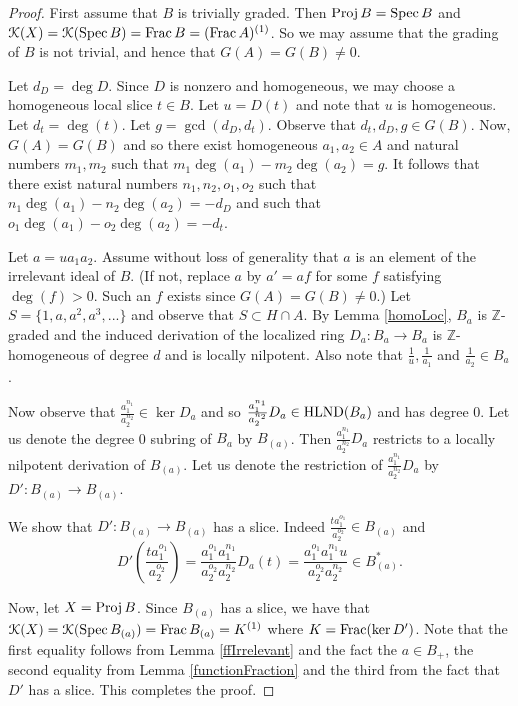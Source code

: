 \documentclass[12pt]{amsart}
\theoremstyle{plain}
\theoremstyle{definition}
\newcommand{\Spec}{		\operatorname{{\rm Spec}}}
\newcommand{\Proj}{		\operatorname{{\rm Proj}}}
\newcommand{\Frac}{		\operatorname{{\rm Frac}}}
\newcommand{\Integ}{\ensuremath{\mathbb{Z}}}
\newcommand{\Keul}{\EuScript{K}}
\newcommand{\hlnd}{\operatorname{{\rm HLND}}}
\begin{document}
\begin{proof}
	First assume that $B$ is trivially graded. Then $\Proj B = \Spec B$ and $\Keul(X) = \Keul(\Spec B) = \Frac B = (\Frac A)^{(1)}$. So we may assume that the grading of $B$ is not trivial, and hence that $G(A) = G(B) \neq 0$.  
	
	Let $d_D = \deg D$. Since $D$ is nonzero and homogeneous, we may choose a homogeneous local slice $t \in B$. Let $u = D(t)$ and note that $u$ is homogeneous. Let $d_t = \deg(t)$. Let $g = \gcd(d_D,d_t)$. Observe that $d_t,d_D,g \in G(B)$. Now, $G(A) = G(B)$ and so there exist homogeneous $a_1,a_2 \in A$ and natural numbers $m_1,m_2$ such that $m_1\deg(a_1) - m_2\deg(a_2) = g$. It follows that there exist natural numbers $n_1,n_2,o_1,o_2$ such that $n_1\deg(a_1) - n_2 \deg(a_2) = -d_D$ and such that $o_1\deg(a_1) - o_2 \deg(a_2) = -d_t$. 
	
	Let $a = ua_1a_2$. Assume without loss of generality that $a$ is an element of the irrelevant ideal of $B$. (If not, replace $a$ by $a' = af$ for some $f$ satisfying $\deg(f) > 0$. Such an $f$ exists since $G(A) = G(B) \neq 0$.) Let $S = \{1, a, a^2, a^3, ... \}$ and observe that $S \subset H \cap A$. By Lemma \ref{homoLoc}, $B_a$ is $\Integ$-graded and the induced derivation of the localized ring $D_a: B_a \to B_a$ is $\Integ$-homogeneous of degree $d$ and is locally nilpotent. Also note that $\frac{1}{u},\frac{1}{a_1}$ and $\frac{1}{a_2} \in B_a$.  
	
	Now observe that $\frac{a_1^{n_1}}{a_2^{n_2}} \in \ker D_a$ and so $\frac{a_1^{n_1}}{a_2^{n_2}} D_a \in \hlnd(B_a)$ and has degree 0. Let us denote the degree 0 subring of $B_a$ by $B_{(a)}$. Then $\frac{a_1^{n_1}}{a_2^{n_2}} D_a$ restricts to a locally nilpotent derivation of $B_{(a)}$. Let us denote the restriction of $\frac{a_1^{n_1}}{a_2^{n_2}} D_a$ by $D' : B_{(a)} \to  B_{(a)}$.  
	
	We show that $D': B_{(a)} \to B_{(a)}$ has a slice. Indeed $\frac{ta_1^{o_1}}{a_2^{o_2}} \in B_{(a)}$ and $$D'(\frac{ta_1^{o_1}}{a_2^{o_2}}) = \frac{a_1^{o_1}a_1^{n_1}}{a_2^{o_2}a_2^{n_2}}D_a(t) = \frac{a_1^{o_1}a_1^{n_1}u}{a_2^{o_2}a_2^{n_2}} \in B_{(a)}^*.$$ 
	
	Now, let $X = \Proj B$. Since $B_{(a)}$ has a slice, we have that $\Keul(X) = \Keul(\Spec B_{(a)}) = \Frac B_{(a)}= K^{(1)}$ where $K = \Frac(\ker D')$. Note that the first equality follows from Lemma \ref{ffIrrelevant} and the fact the $a \in B_+$, the second equality from Lemma \ref{functionFraction} and the third from the fact that $D'$ has a slice. This completes the proof.     
\end{proof}
\end{document}
